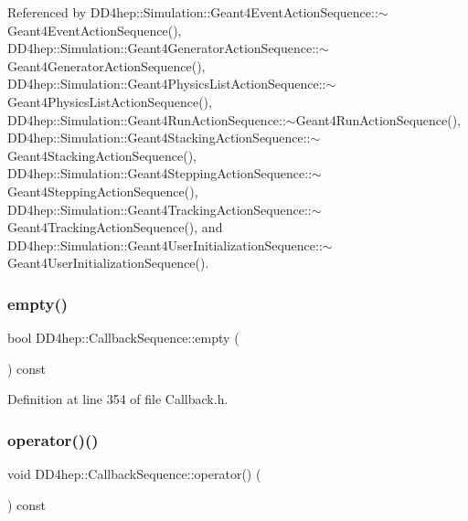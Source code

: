 Referenced by D\+D4hep\+::\+Simulation\+::\+Geant4\+Event\+Action\+Sequence\+::$\sim$\+Geant4\+Event\+Action\+Sequence(), D\+D4hep\+::\+Simulation\+::\+Geant4\+Generator\+Action\+Sequence\+::$\sim$\+Geant4\+Generator\+Action\+Sequence(), D\+D4hep\+::\+Simulation\+::\+Geant4\+Physics\+List\+Action\+Sequence\+::$\sim$\+Geant4\+Physics\+List\+Action\+Sequence(), D\+D4hep\+::\+Simulation\+::\+Geant4\+Run\+Action\+Sequence\+::$\sim$\+Geant4\+Run\+Action\+Sequence(), D\+D4hep\+::\+Simulation\+::\+Geant4\+Stacking\+Action\+Sequence\+::$\sim$\+Geant4\+Stacking\+Action\+Sequence(), D\+D4hep\+::\+Simulation\+::\+Geant4\+Stepping\+Action\+Sequence\+::$\sim$\+Geant4\+Stepping\+Action\+Sequence(), D\+D4hep\+::\+Simulation\+::\+Geant4\+Tracking\+Action\+Sequence\+::$\sim$\+Geant4\+Tracking\+Action\+Sequence(), and D\+D4hep\+::\+Simulation\+::\+Geant4\+User\+Initialization\+Sequence\+::$\sim$\+Geant4\+User\+Initialization\+Sequence().

\hypertarget{struct_d_d4hep_1_1_callback_sequence_ad8be82cada6e445690231bd157e6087d}{}\label{struct_d_d4hep_1_1_callback_sequence_ad8be82cada6e445690231bd157e6087d} 
\subsubsection{\texorpdfstring{empty()}{empty()}}
{\footnotesize\ttfamily bool D\+D4hep\+::\+Callback\+Sequence\+::empty (\begin{DoxyParamCaption}{ }\end{DoxyParamCaption}) const\hspace{0.3cm}{\ttfamily [inline]}}



Definition at line 354 of file Callback.\+h.

\hypertarget{struct_d_d4hep_1_1_callback_sequence_abd58114c7c8982a6110f2a0a016c83aa}{}\label{struct_d_d4hep_1_1_callback_sequence_abd58114c7c8982a6110f2a0a016c83aa} 
\subsubsection{\texorpdfstring{operator()()}{operator()()}\hspace{0.1cm}{\footnotesize\ttfamily [1/4]}}
{\footnotesize\ttfamily void D\+D4hep\+::\+Callback\+Sequence\+::operator() (\begin{DoxyParamCaption}{ }\end{DoxyParamCaption}) const\hspace{0.3cm}{\ttfamily [inline]}}




